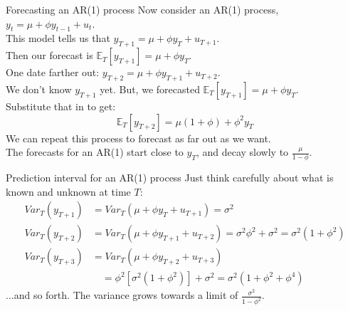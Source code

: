 \documentclass[t,12pt]{beamer}
\begin{document}
\begin{frame}[c]{Forecasting an AR(1) process}
Now consider an AR(1) process, $y_t = \mu + \phi y_{t-1} + u_t$.
\\ \bigskip
This model tells us that $y_{T+1} = \mu + \phi y_T + u_{T+1}$.
\\ Then our forecast is $\mathbb{E}_T[y_{T+1}] = \mu + \phi y_T$.
\\ \bigskip
One date farther out: $y_{T+2} = \mu + \phi y_{T+1} + u_{T+2}$.
\\ \smallskip We don't know $y_{T+1}$ yet. But, we forecasted $\mathbb{E}_T[y_{T+1}] = \mu + \phi y_T$.
\\ \smallskip Substitute that in to get:
$$
\mathbb{E}_T[y_{T+2}] = \mu(1+\phi) + \phi^2 y_T
$$
We can repeat this process to forecast as far out as we want.
\\ \medskip
The forecasts for an AR(1) start close to $y_T$, and decay slowly to $\frac{\mu}{1-\phi}$.
\end{frame}

\begin{frame}[c]{Prediction interval for an AR(1) process}
Just think carefully about what is known and unknown at time $T$:
\begin{align*}
Var_T(y_{T+1}) &= Var_T(\mu + \phi y_{T} + u_{T+1}) = \sigma^2
\\
Var_T(y_{T+2}) &= Var_T(\mu + \phi y_{T+1} + u_{T+2}) = \sigma^2 \phi^2 + \sigma^2 = \sigma^2(1+\phi^2)
\\
Var_T(y_{T+3}) &= Var_T(\mu + \phi y_{T+2} + u_{T+3}) 
\\
&\quad = \phi^2 [ \sigma^2(1 + \phi^2)] + \sigma^2 = \sigma^2(1+\phi^2+\phi^4)
\end{align*}
...and so forth. The variance grows towards a limit of $\frac{\sigma^2}{1-\phi^2}$.
\end{frame}
\end{document}
